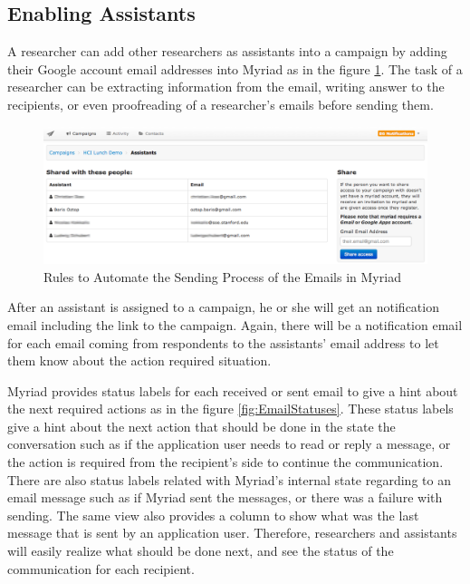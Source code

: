 \subsection{Enabling Assistants}
\label{subsec:5.2.6:EnabAssi}

A researcher can add other researchers as assistants into a campaign by adding their Google account email addresses into Myriad as in the figure \ref{fig:AddAssistants}. The task of a researcher can be extracting information from the email, writing answer to the recipients, or even proofreading of a researcher's emails before sending them.

\clearpage

\begin{figure}[htbp]
	\centering
	\includegraphics[width=1.00\textwidth]{imgs/AddAssistants.png}
	\caption[Rules to Automate the Sending Process of the Emails in Myriad]{Rules to Automate the Sending Process of the Emails in Myriad}
	\label{fig:AddAssistants}
\end{figure}

After an assistant is assigned to a campaign, he or she will get an notification email including the link to the campaign. Again, there will be a notification email for each email coming from respondents to the assistants' email address to let them know about the action required situation.
\vspace{1cm}

Myriad provides status labels for each received or sent email to give a hint about the next required actions as in the figure \ref{fig:EmailStatuses}. These status labels give a hint about the next action that should be done in the state the conversation such as if the application user needs to read or reply a message, or the action is required from the recipient's side to continue the communication. There are also status labels related with Myriad's internal state regarding to an email message such as if Myriad sent the messages, or there was a failure with sending. The same view also provides a column to show what was the last message that is sent by an application user. Therefore, researchers and assistants will easily realize what should be done next, and see the status of the communication for each recipient. 

